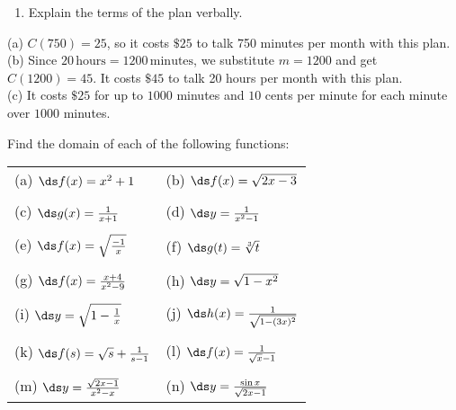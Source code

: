 \begin{enumialphparenastyle}
\begin{multicols}{2}
\begin{ex}
\begin{enumerate}
	\item  Explain the terms of the plan verbally.  %
	
\end{enumerate}	
\begin{sol}
	
(a) \hspace{2mm} $C(750) = 25$, so it costs $\$ 25$ to talk 750 minutes per month with this plan. \\

(b) \hspace{2mm} Since $20 \, \text{hours} = 1200 \, \text{minutes}$, we substitute $m = 1200$ and get  $C(1200) = 45$.  It costs $\$ 45$ to talk 20 hours per month with this plan. \\ 

(c) \hspace{2mm}  It costs $\$25$ for up to $1000$ minutes and $10$ cents per minute for each minute over $1000$ minutes.

	
\end{sol}		
\end{ex}
		



\begin{ex}
Find the domain of each of the following functions:

\begin{tabular}{ll}
	(a)	$\ds f(x)=x^2+1$ & (b)	$\ds f(x)=\sqrt{2x-3}$ \\
	& \\ [0em]
	(c) $\ds g(x)=\frac{1}{x+1}$ & (d) $\ds y=\frac{1}{x^2-1}$ \\
	& \\ [0em]
	(e) $\ds f(x)=\sqrt{\frac{-1}{x}}$ & (f) $\ds g(t)={\root 3 \of t}$ \\
	& \\ [0em]
	(g) $\ds f(x)=\frac{x+4}{x^{2}-9}$ & (h) $\ds y=\sqrt{1-x^2}$ \\
	& \\ [0em]
	(i) $\ds y=\sqrt{1-\frac{1}{x} }$ & (j) $\ds h(x)=\frac{1}{\sqrt{1-(3x)^2}}$ \\
	& \\ [0em]
	(k) $\ds f(s)=\sqrt{s}+\frac{1}{s-1}$ & (l) $\ds f(x)=\frac{1}{\sqrt{x}-1}$ \\
	& \\ [0em]
	(m) $\ds y=\frac{\sqrt{2x-1}}{x^{2}-x}$ & (n)  $\ds y=\frac{\sin x}{\sqrt{2x-1}}$
\end{tabular}


\end{ex}
\end{multicols}
\end{enumialphparenastyle}
